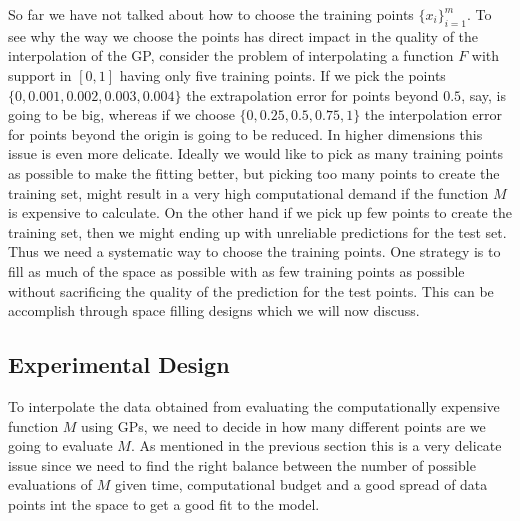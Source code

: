 \documentclass[12pt]{book}
\begin{document}
So far we have not talked about how to choose the training points $\{x_{i}\}_{i=1}^{m}$. To see
why the way we choose the points has direct impact in the quality of the interpolation of the GP,
consider the problem of interpolating a function $F$ with support in $[0,1]$ having only five training
points. If we pick the points $\{0,0.001,0.002,0.003,0.004\}$ the extrapolation error for points beyond $0.5$, say,
is going to be big, whereas if we choose $\{0,0.25,0.5,0.75,1\}$ the interpolation error for points beyond
the origin is going to be reduced. In higher dimensions this issue is even more delicate.  Ideally 
we would like to pick as many training points as possible to make the fitting better, but picking too many points
to create the training set, might result in a very high computational demand if the function $M$ is expensive
to calculate. On the other hand if we pick up
 few points to create the training set, then we  might ending up with unreliable predictions for the test
set. Thus we need a systematic way to choose  the training points. One strategy is to  
 fill as much of the space as possible with as few training points as possible without
sacrificing the quality of the prediction for the test points. This can be accomplish
through    space filling designs which we will now discuss. 
\newline

\subsection{Experimental Design }


 To interpolate the data obtained from evaluating the computationally expensive function
$M$ using GPs, we need to decide in how many different points are we going to evaluate $M$. 
As mentioned in the previous section this is a very delicate issue since we need to find 
the right balance between
the number of possible evaluations of $M$ given time, computational budget 
 and a good spread of data points int the space to get a good
fit to the model.
\newline
 
\end{document}
